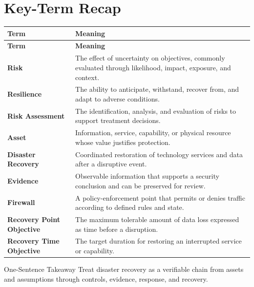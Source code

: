 \documentclass[11pt,letterpaper]{article}
\begin{document}
\section*{Key-Term Recap}
\begin{longtable}{>{\raggedright\arraybackslash}p{}>{\raggedright\arraybackslash}p{}}
\toprule\rowcolor{Navy}\color{white}\textbf{Term} & \color{white}\textbf{Meaning}\\\midrule
\endfirsthead
\toprule\rowcolor{Navy}\color{white}\textbf{Term} & \color{white}\textbf{Meaning}\\\midrule
\endhead
\textbf{Risk} & The effect of uncertainty on objectives, commonly evaluated through likelihood, impact, exposure, and context. \\\midrule
\textbf{Resilience} & The ability to anticipate, withstand, recover from, and adapt to adverse conditions. \\\midrule
\textbf{Risk Assessment} & The identification, analysis, and evaluation of risks to support treatment decisions. \\\midrule
\textbf{Asset} & Information, service, capability, or physical resource whose value justifies protection. \\\midrule
\textbf{Disaster Recovery} & Coordinated restoration of technology services and data after a disruptive event. \\\midrule
\textbf{Evidence} & Observable information that supports a security conclusion and can be preserved for review. \\\midrule
\textbf{Firewall} & A policy-enforcement point that permits or denies traffic according to defined rules and state. \\\midrule
\textbf{Recovery Point Objective} & The maximum tolerable amount of data loss expressed as time before a disruption. \\\midrule
\textbf{Recovery Time Objective} & The target duration for restoring an interrupted service or capability. \\\midrule
\bottomrule
\end{longtable}
\begin{CornellExamBox}{One-Sentence Takeaway}
Treat disaster recovery as a verifiable chain from assets and assumptions through controls, evidence, response, and recovery.
\end{CornellExamBox}
\end{document}
